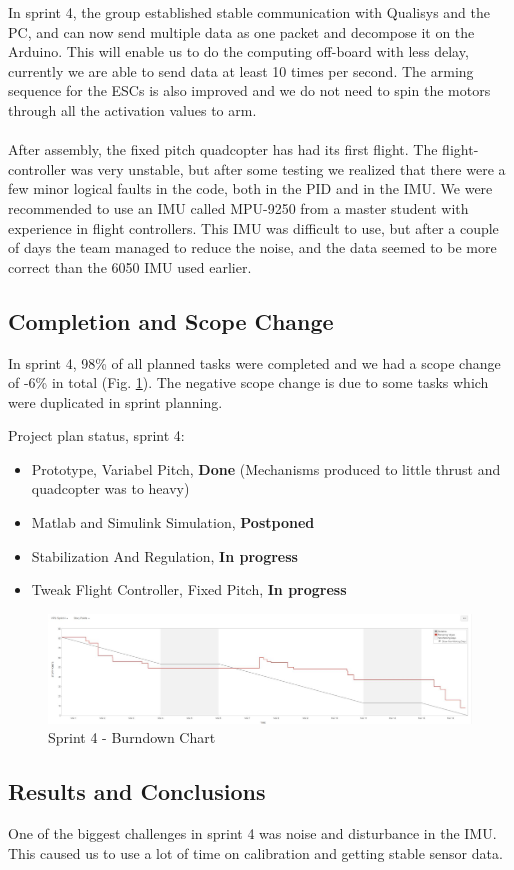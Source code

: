 In sprint 4, the group established stable communication with Qualisys and the PC, and can now send multiple data as one packet and decompose it on the Arduino. This will enable us to do the computing off-board with less delay, currently we are able to send data at least 10 times per second. The arming sequence for the ESCs is also improved and we do not need to spin the motors through all the activation values to arm. \\
\\
After assembly, the fixed pitch quadcopter has had its first flight. The flight-controller was very unstable, but after some testing we realized that there were a few minor logical faults in the code, both in the PID and in the IMU. We were recommended to use an IMU called MPU-9250 from a master student with experience in flight controllers. This IMU was difficult to use, but after a couple of days the team managed to reduce the noise, and the data seemed to be more correct than the 6050 IMU used earlier.
\\
\subsection{Completion and Scope Change}

In sprint 4, 98\% of all planned tasks were completed and we had a scope change of -6\% in total (Fig. \ref{fig:bds4}). The negative scope change is due to some tasks which were duplicated in sprint planning.

Project plan status, sprint 4:
        
    \begin{itemize}
        \item Prototype, Variabel Pitch, \textbf{Done} (Mechanisms produced to little thrust and quadcopter was to heavy)
        \item Matlab and Simulink Simulation, \textbf{Postponed}
        \item Stabilization And Regulation, \textbf{In progress}
        \item Tweak Flight Controller, Fixed Pitch, \textbf{In progress}
    \end{itemize}
        
        

\begin{figure}[h]
    \centering
         \includegraphics[width = 1\textwidth]{VAPIQ-PICTURES/BDSprint4}
      \caption{Sprint 4 - Burndown Chart}
    \label{fig:bds4}
\end{figure} 


\subsection{Results and Conclusions}

One of the biggest challenges in sprint 4 was noise and disturbance in the IMU. This caused us to use a lot of time on calibration and getting stable sensor data.

